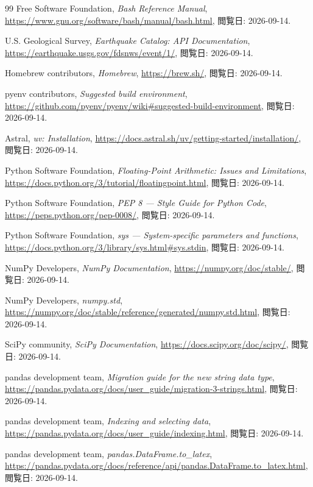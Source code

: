 \begin{thebibliography}{99}
Free Software Foundation,
\textit{Bash Reference Manual},
\url{https://www.gnu.org/software/bash/manual/bash.html},
閲覧日: 2026-09-14.

U.S. Geological Survey,
\textit{Earthquake Catalog: API Documentation},
\url{https://earthquake.usgs.gov/fdsnws/event/1/},
閲覧日: 2026-09-14.

Homebrew contributors,
\textit{Homebrew},
\url{https://brew.sh/},
閲覧日: 2026-09-14.

pyenv contributors,
\textit{Suggested build environment},
\url{https://github.com/pyenv/pyenv/wiki#suggested-build-environment},
閲覧日: 2026-09-14.

Astral,
\textit{uv: Installation},
\url{https://docs.astral.sh/uv/getting-started/installation/},
閲覧日: 2026-09-14.

Python Software Foundation,
\textit{Floating-Point Arithmetic: Issues and Limitations},
\url{https://docs.python.org/3/tutorial/floatingpoint.html},
閲覧日: 2026-09-14.

Python Software Foundation,
\textit{PEP 8 --- Style Guide for Python Code},
\url{https://peps.python.org/pep-0008/},
閲覧日: 2026-09-14.

Python Software Foundation,
\textit{sys --- System-specific parameters and functions},
\url{https://docs.python.org/3/library/sys.html#sys.stdin},
閲覧日: 2026-09-14.

NumPy Developers,
\textit{NumPy Documentation},
\url{https://numpy.org/doc/stable/},
閲覧日: 2026-09-14.

NumPy Developers,
\textit{numpy.std},
\url{https://numpy.org/doc/stable/reference/generated/numpy.std.html},
閲覧日: 2026-09-14.

SciPy community,
\textit{SciPy Documentation},
\url{https://docs.scipy.org/doc/scipy/},
閲覧日: 2026-09-14.

pandas development team,
\textit{Migration guide for the new string data type},
\url{https://pandas.pydata.org/docs/user_guide/migration-3-strings.html},
閲覧日: 2026-09-14.

pandas development team,
\textit{Indexing and selecting data},
\url{https://pandas.pydata.org/docs/user_guide/indexing.html},
閲覧日: 2026-09-14.

pandas development team,
\textit{pandas.DataFrame.to\_latex},
\url{https://pandas.pydata.org/docs/reference/api/pandas.DataFrame.to_latex.html},
閲覧日: 2026-09-14.


\end{thebibliography}
